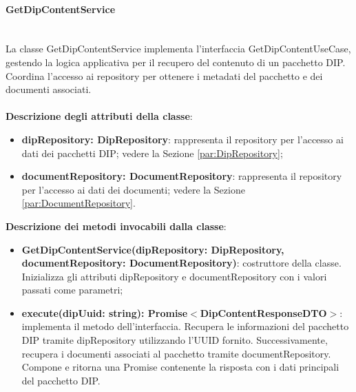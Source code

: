 \documentclass[a4paper,12pt]{article}
\begin{document}
{{                \paragraph{GetDipContentService}\label{par:GetDipContentService}\mbox{}\\
                La classe GetDipContentService implementa l'interfaccia GetDipContentUseCase, gestendo la logica applicativa per il recupero del contenuto di un pacchetto DIP. Coordina l'accesso ai repository per ottenere i metadati del pacchetto e dei documenti associati.\\
                \\
                \textbf{Descrizione degli attributi della classe}:
                \begin{itemize}
                    \item \textbf{dipRepository: DipRepository}: rappresenta il repository per l'accesso ai dati dei pacchetti DIP; vedere la Sezione \ref{par:DipRepository};
                    \item \textbf{documentRepository: DocumentRepository}: rappresenta il repository per l'accesso ai dati dei documenti; vedere la Sezione \ref{par:DocumentRepository}.
                \end{itemize}
                
              \noindent \textbf{Descrizione dei metodi invocabili dalla classe}:
                \begin{itemize}
                    \item \textbf{GetDipContentService(dipRepository: DipRepository, documentRepository: DocumentRepository)}: costruttore della classe. Inizializza gli attributi dipRepository e documentRepository con i valori passati come parametri;
                    \item \textbf{execute(dipUuid: string): Promise$<$DipContentResponseDTO$>$}: implementa il metodo dell'interfaccia. Recupera le informazioni del pacchetto DIP tramite dipRepository utilizzando l'UUID fornito. Successivamente, recupera i documenti associati al pacchetto tramite documentRepository. Compone e ritorna una Promise contenente la risposta con i dati principali del pacchetto DIP.
                \end{itemize}
}}
\end{document}
